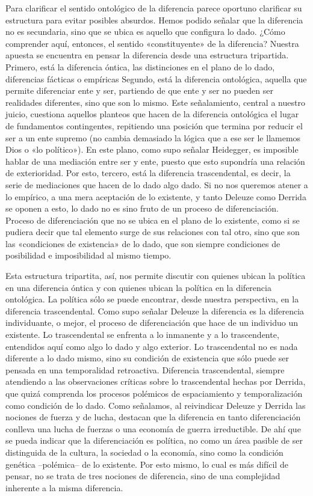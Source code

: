 Para clarificar el sentido ontológico de la diferencia parece oportuno clarificar su estructura para evitar posibles absurdos. Hemos podido señalar que la diferencia no es secundaria, sino que se ubica es aquello que configura lo dado. ¿Cómo comprender aquí, entonces, el sentido «constituyente» de la diferencia? Nuestra apuesta se encuentra en pensar la diferencia desde una estructura tripartida. Primero, está la diferencia óntica, las distinciones en el plano de lo dado, diferencias fácticas o empíricas Segundo, está la diferencia ontológica, aquella que permite diferenciar ente y ser, partiendo de que ente y ser no pueden ser realidades diferentes, sino que son lo mismo. Este señalamiento, central a nuestro juicio, cuestiona aquellos planteos que hacen de la diferencia ontológica el lugar de fundamentos contingentes, repitiendo una posición que termina por reducir el ser a un ente supremo (no cambia demasiado la lógica que a ese ser le llamemos Dios o «lo político»). En este plano, como supo señalar Heidegger, es imposible hablar de una mediación entre ser y ente, puesto que esto supondría una relación de exterioridad. Por esto, tercero, está la diferencia trascendental, es decir, la serie de mediaciones que hacen de lo dado algo dado. Si no nos queremos atener a lo empírico, a una mera aceptación de lo existente, y tanto Deleuze como Derrida se oponen a esto, lo dado no es sino fruto de un proceso de diferenciación. Proceso de diferenciación que no se ubica en el plano de lo existente, como si se pudiera decir que tal elemento surge de sus relaciones con tal otro, sino que son las «condiciones de existencia» de lo dado, que son siempre condiciones de posibilidad e imposibilidad al mismo tiempo.

Esta estructura tripartita, así, nos permite discutir con quienes ubican la política en una diferencia óntica y con quienes ubican la política en la diferencia ontológica. La política sólo se puede encontrar, desde nuestra perspectiva, en la diferencia trascendental. Como supo señalar Deleuze la diferencia es la diferencia individuante, o mejor, el proceso de diferenciación que hace de un individuo un existente. Lo trascendental se enfrenta a lo inmanente y a lo trascendente, entendidos aquí como algo lo dado y algo exterior. Lo trascendental no es nada diferente a lo dado mismo, sino su condición de existencia que sólo puede ser pensada en una temporalidad retroactiva. Diferencia trascendental, siempre atendiendo a las observaciones críticas sobre lo trascendental hechas por Derrida, que quizá comprenda los procesos polémicos de espaciamiento y temporalización como condición de lo dado. Como señalamos, al reivindicar Deleuze y Derrida las nociones de fuerza y de lucha, destacan que la diferencia en tanto diferenciación conlleva una lucha de fuerzas o una economía de guerra irreductible. De ahí que se pueda indicar que la diferenciación es política, no como un área pasible de ser distinguida de la cultura, la sociedad o la economía, sino como la condición genética --polémica-- de lo existente. Por esto mismo, lo cual es más difícil de pensar, no se trata de tres nociones de diferencia, sino de una complejidad inherente a la misma diferencia.

